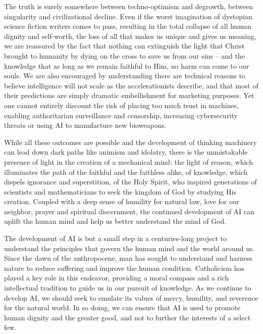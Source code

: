 \documentclass[sigplan,nonacm]{acmart}\settopmatter{printfolios=false,printccs=false,printacmref=false}
\begin{document}
The truth is surely somewhere between techno-optimism and degrowth, between singularity and civilizational decline. Even if the worst imagination of dystopian science fiction writers comes to pass, resulting in the total collapse of all human dignity and self-worth, the loss of all that makes us unique and gives us meaning, we are reassured by the fact that nothing can extinguish the light that Christ brought to humanity by dying on the cross to save us from our sins -- and the knowledge that as long as we remain faithful to Him, no harm can come to our souls. We are also encouraged by understanding there are technical reasons to believe intelligence will not scale as the accelerationists describe, and that most of their predictions are simply dramatic embellishment for marketing purposes. Yet one cannot entirely discount the risk of placing too much trust in machines, enabling authoritarian surveillance and censorship, increasing cybersecurity threats or using AI to manufacture new bioweapons.

While all these outcomes are possible and the development of thinking machinery can lead down dark paths like animism and idolatry, there is the unmistakable presence of light in the creation of a mechanical mind: the light of reason, which illuminates the path of the faithful and the faithless alike, of knowledge, which dispels ignorance and superstition, of the Holy Spirit, who inspired generations of scientists and mathematicians to seek the kingdom of God by studying His creation. Coupled with a deep sense of humility for natural law, love for our neighbor, prayer and spiritual discernment, the continued development of AI can uplift the human mind and help us better understand the mind of God.

The development of AI is but a small step in a centuries-long project to understand the principles that govern the human mind and the world around us. Since the dawn of the anthropocene, man has sought to understand and harness nature to reduce suffering and improve the human condition. Catholicism has played a key role in this endeavor, providing a moral compass and a rich intellectual tradition to guide us in our pursuit of knowledge. As we continue to develop AI, we should seek to emulate its values of mercy, humility, and reverence for the natural world. In so doing, we can ensure that AI is used to promote human dignity and the greater good, and not to further the interests of a select few.


\clearpage
\end{document}
